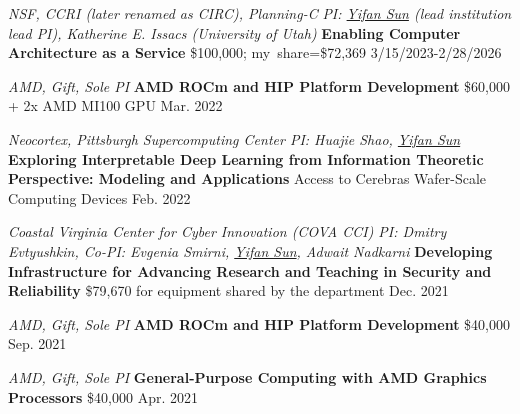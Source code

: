 \begin{cventries}
  \cvgrantentry
    {\textit{NSF, CCRI (later renamed as CIRC), Planning-C}
    \linebreak
    \textit{PI: \underline{Yifan Sun} (lead institution lead PI), Katherine E. Issacs (University of Utah)}}
    {\textbf{Enabling Computer Architecture as a Service}}
    {\$100,000; my~share=\$72,369}
    {3/15/2023-2/28/2026}
    {}
    \vspace{-0.5cm}
  
  \cvgrantentry
    {\textit{AMD, Gift, Sole PI}}
    {\textbf{AMD ROCm and HIP Platform Development}}
    {\$60,000 + 2x AMD MI100 GPU}
    {Mar. 2022}
    {}
    \vspace{-0.5cm}
  
  \cvgrantentry
    {\textit{Neocortex, Pittsburgh Supercomputing Center \linebreak PI: Huajie Shao, \underline{Yifan Sun}}}
    {\textbf{Exploring Interpretable Deep Learning from Information Theoretic Perspective:  Modeling and Applications}}
    {Access to Cerebras Wafer-Scale Computing Devices}
    {Feb. 2022}
    {}
    \vspace{-0.5cm}
  
  \cvgrantentry
    {\textit{Coastal Virginia Center for Cyber Innovation (COVA CCI) \linebreak PI: Dmitry Evtyushkin, Co-PI: Evgenia Smirni, \underline{Yifan Sun}, Adwait Nadkarni}}
    {\textbf{Developing Infrastructure for Advancing Research and Teaching \linebreak in Security and Reliability}}
    {\$79,670 for equipment shared by the department}
    {Dec. 2021}
    {}
    \vspace{-0.5cm}

  \cvgrantentry
    {\textit{AMD, Gift, Sole PI}}
    {\textbf{AMD ROCm and HIP Platform Development}}
    {\$40,000}
    {Sep. 2021}
    {}
    \vspace{-0.5cm}
    
  \cvgrantentry
    {\textit{AMD, Gift, Sole PI}}
    {\textbf{General-Purpose Computing with AMD Graphics Processors}}
    {\$40,000}
    {Apr. 2021}
    {}
    \vspace{-0.5cm}
    


\end{cventries}

